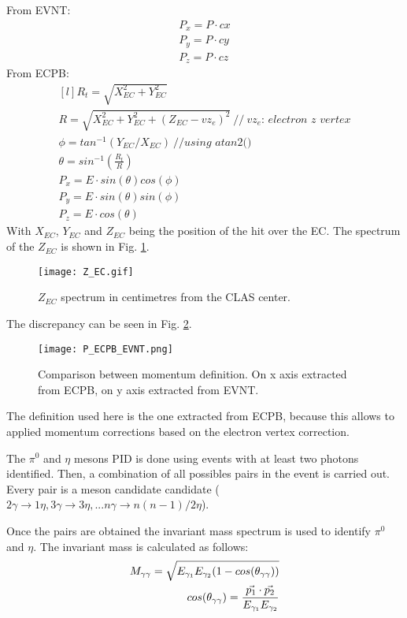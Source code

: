From EVNT:
\begin{equation}
\begin{matrix}
P_x=P \cdot cx\\
P_y=P \cdot cy\\
P_z=P \cdot cz
\end{matrix}
\label{eq:P_EVNT}
\end{equation}
%
From ECPB:
\begin{equation}
\begin{matrix*}[l]
R_t = \sqrt{X_{EC}^2 + Y_{EC}^2}\\
R  =  \sqrt{X_{EC}^2 + Y_{EC}^2 + (Z_{EC}-vz_e)^2}~//~vz_e\textit{: electron z vertex}\\
\phi = tan^{-1}(Y_{EC}/X_{EC})~//\textit{using atan2()}\\
\theta =sin^{-1}(\frac{R_t}{R})\\
P_x=E \cdot sin(\theta)cos(\phi)\\
P_y=E \cdot sin(\theta)sin(\phi)\\
P_z=E \cdot cos(\theta)
\end{matrix*}
\label{eq:P_ECPB}
\end{equation}
%
With $X_{EC}$, $Y_{EC}$ and $Z_{EC}$ being the position of the hit over the EC. The spectrum of the $Z_{EC}$  is shown in Fig. \ref{fig:EC_Z}.
%
\begin{figure}[!ht]
\centering
\texttt{[image: Z\_EC.gif]}
\caption{$Z_{EC}$ spectrum in centimetres from the CLAS center.}
\label{fig:EC_Z}
\end{figure}
%
The discrepancy can be seen in Fig. \ref{fig:P_ECPB_EVNT}.
%
\begin{figure}[!ht]
\centering
\texttt{[image: P\_ECPB\_EVNT.png]}
\caption{Comparison between momentum definition. On x axis extracted from ECPB, on y axis extracted from EVNT.}
\label{fig:P_ECPB_EVNT}
\end{figure}
%
The definition used here is the one extracted from ECPB, because this allows to applied momentum corrections based on the electron vertex correction.

The $\pi^0$ and $\eta$ mesons PID is done using events with at least two photons identified. Then, a combination of all possibles pairs in the event is carried out. Every pair is a meson candidate candidate ($2\gamma \rightarrow 1\eta, 3\gamma \rightarrow 3\eta,... n\gamma \rightarrow n(n-1)/2 \eta$).

Once the pairs are obtained the invariant mass spectrum is used to identify $\pi^0$ and $\eta$. The invariant mass is calculated as follows:
\begin{align}
M_{\gamma\gamma} = \sqrt{E_{\gamma_1}E_{\gamma_2}(1-cos(\theta_{\gamma\gamma}))}\\
cos(\theta_{\gamma\gamma}) = \frac{\vec{p_1}\cdot\vec{p_2}}{E_{\gamma_1}E_{\gamma_2}} \notag
\label{eq:M_aa}
\end{align}
%
\clearpage
